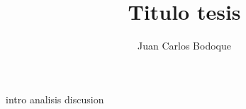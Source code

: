 \documentclass[spanish]{tesis}
\title{Titulo tesis}
\author{Juan Carlos Bodoque}
\begin{document}




\clearevenpage %
\tableofcontents

\cleardoublepage %
\pagestyle{everypage}
{intro}
{analisis}
{discusion}


% 

\thispagestyle{empty}
\clearevenpage
\end{document}
